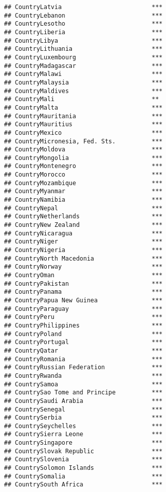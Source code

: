 \documentclass[
]{article}
\begin{document}
\begin{verbatim}
## CountryLatvia                         ***
## CountryLebanon                        ***
## CountryLesotho                        ***
## CountryLiberia                        ***
## CountryLibya                          ***
## CountryLithuania                      ***
## CountryLuxembourg                     ***
## CountryMadagascar                     ***
## CountryMalawi                         ***
## CountryMalaysia                       ***
## CountryMaldives                       ***
## CountryMali                           ** 
## CountryMalta                          ***
## CountryMauritania                     ***
## CountryMauritius                      ***
## CountryMexico                         ***
## CountryMicronesia, Fed. Sts.          ***
## CountryMoldova                        ***
## CountryMongolia                       ***
## CountryMontenegro                     ***
## CountryMorocco                        ***
## CountryMozambique                     ***
## CountryMyanmar                        ***
## CountryNamibia                        ***
## CountryNepal                          ***
## CountryNetherlands                    ***
## CountryNew Zealand                    ***
## CountryNicaragua                      ***
## CountryNiger                          ***
## CountryNigeria                        ***
## CountryNorth Macedonia                ***
## CountryNorway                         ***
## CountryOman                           ***
## CountryPakistan                       ***
## CountryPanama                         ***
## CountryPapua New Guinea               ***
## CountryParaguay                       ***
## CountryPeru                           ***
## CountryPhilippines                    ***
## CountryPoland                         ***
## CountryPortugal                       ***
## CountryQatar                          ***
## CountryRomania                        ***
## CountryRussian Federation             ***
## CountryRwanda                         ***
## CountrySamoa                          ***
## CountrySao Tome and Principe          ***
## CountrySaudi Arabia                   ***
## CountrySenegal                        ***
## CountrySerbia                         ***
## CountrySeychelles                     ***
## CountrySierra Leone                   ***
## CountrySingapore                      ***
## CountrySlovak Republic                ***
## CountrySlovenia                       ***
## CountrySolomon Islands                ***
## CountrySomalia                        ***
## CountrySouth Africa                   ***

\end{verbatim}
\end{document}
